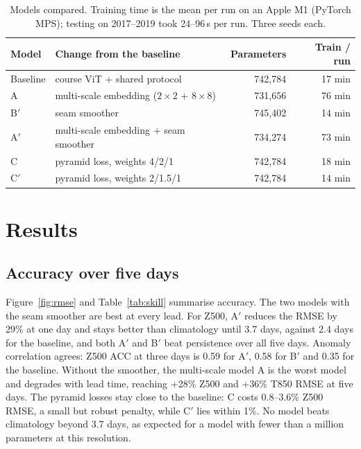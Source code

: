 \documentclass{article}
\begin{document}
\begin{table}[t]
  \caption{Models compared. Training time is the mean per run on an Apple M1 (PyTorch MPS); testing on 2017--2019 took 24--96\,s per run. Three seeds each.}
  \label{tab:models}
  \centering
  \small
  \begin{tabular}{llrr}
    \toprule
    Model & Change from the baseline & Parameters & Train / run \\
    \midrule
    Baseline & course ViT + shared protocol & 742,784 & 17 min \\
    A        & multi-scale embedding ($2\times2$ + $8\times8$) & 731,656 & 76 min \\
    B$'$     & seam smoother & 745,402 & 14 min \\
    A$'$     & multi-scale embedding + seam smoother & 734,274 & 73 min \\
    C        & pyramid loss, weights 4/2/1 & 742,784 & 18 min \\
    C$'$     & pyramid loss, weights 2/1.5/1 & 742,784 & 14 min \\
    \bottomrule
  \end{tabular}
\end{table}

\section{Results}
\label{sec:results}

\subsection{Accuracy over five days}
Figure~\ref{fig:rmse} and Table~\ref{tab:skill} summarise accuracy. The two models with the seam smoother are best at every lead. For Z500, A$'$ reduces the RMSE by 29\% at one day and stays better than climatology until 3.7 days, against 2.4 days for the baseline, and both A$'$ and B$'$ beat persistence over all five days. Anomaly correlation agrees: Z500 ACC at three days is 0.59 for A$'$, 0.58 for B$'$ and 0.35 for the baseline. Without the smoother, the multi-scale model A is the worst model and degrades with lead time, reaching +28\% Z500 and +36\% T850 RMSE at five days. The pyramid losses stay close to the baseline: C costs 0.8--3.6\% Z500 RMSE, a small but robust penalty, while C$'$ lies within 1\%. No model beats climatology beyond 3.7 days, as expected for a model with fewer than a million parameters at this resolution.
\end{document}

